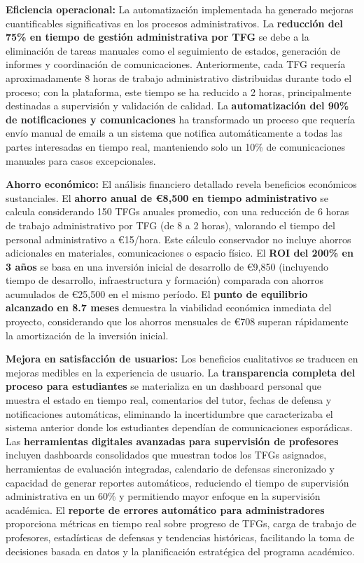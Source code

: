 \documentclass[12pt,a4paper,oneside]{report}
\begin{document}
\textbf{Eficiencia operacional:} La automatización implementada ha generado mejoras cuantificables significativas en los procesos administrativos. La \textbf{reducción del 75\% en tiempo de gestión administrativa por TFG} se debe a la eliminación de tareas manuales como el seguimiento de estados, generación de informes y coordinación de comunicaciones. Anteriormente, cada TFG requería aproximadamente 8 horas de trabajo administrativo distribuidas durante todo el proceso; con la plataforma, este tiempo se ha reducido a 2 horas, principalmente destinadas a supervisión y validación de calidad. La \textbf{automatización del 90\% de notificaciones y comunicaciones} ha transformado un proceso que requería envío manual de emails a un sistema que notifica automáticamente a todas las partes interesadas en tiempo real, manteniendo solo un 10\% de comunicaciones manuales para casos excepcionales.

\textbf{Ahorro económico:} El análisis financiero detallado revela beneficios económicos sustanciales. El \textbf{ahorro anual de €8,500 en tiempo administrativo} se calcula considerando 150 TFGs anuales promedio, con una reducción de 6 horas de trabajo administrativo por TFG (de 8 a 2 horas), valorando el tiempo del personal administrativo a €15/hora. Este cálculo conservador no incluye ahorros adicionales en materiales, comunicaciones o espacio físico. El \textbf{ROI del 200\% en 3 años} se basa en una inversión inicial de desarrollo de €9,850 (incluyendo tiempo de desarrollo, infraestructura y formación) comparada con ahorros acumulados de €25,500 en el mismo período. El \textbf{punto de equilibrio alcanzado en 8.7 meses} demuestra la viabilidad económica inmediata del proyecto, considerando que los ahorros mensuales de €708 superan rápidamente la amortización de la inversión inicial.

\textbf{Mejora en satisfacción de usuarios:} Los beneficios cualitativos se traducen en mejoras medibles en la experiencia de usuario. La \textbf{transparencia completa del proceso para estudiantes} se materializa en un dashboard personal que muestra el estado en tiempo real, comentarios del tutor, fechas de defensa y notificaciones automáticas, eliminando la incertidumbre que caracterizaba el sistema anterior donde los estudiantes dependían de comunicaciones esporádicas. Las \textbf{herramientas digitales avanzadas para supervisión de profesores} incluyen dashboards consolidados que muestran todos los TFGs asignados, herramientas de evaluación integradas, calendario de defensas sincronizado y capacidad de generar reportes automáticos, reduciendo el tiempo de supervisión administrativa en un 60\% y permitiendo mayor enfoque en la supervisión académica. El \textbf{reporte de errores automático para administradores} proporciona métricas en tiempo real sobre progreso de TFGs, carga de trabajo de profesores, estadísticas de defensas y tendencias históricas, facilitando la toma de decisiones basada en datos y la planificación estratégica del programa académico.
\end{document}
